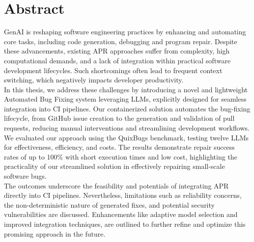 \thispagestyle{empty}%

\section*{Abstract}
\ac{GenAI} is reshaping software engineering practices by enhancing and automating core tasks, including code generation, debugging and program repair. Despite these advancements, existing \ac{APR} approaches suffer from complexity, high computational demands, and a lack of integration within practical software development lifecycles. Such shortcomings often lead to frequent context switching, which negatively impacts developer productivity.\\
In this thesis, we address these challenges by introducing a novel and lightweight Automated Bug Fixing system leveraging \acp{LLM}, explicitly designed for seamless integration into \ac{CI} pipelines. Our containerized solution automates the bug-fixing lifecycle, from GitHub issue creation to the generation and validation of pull requests, reducing manual interventions and streamlining development workflows.\\
We evaluated our approach using the QuixBugs benchmark, testing twelve LLMs for effectiveness, efficiency, and costs. The results demonstrate repair success rates of up to 100\% with short execution times and low cost, highlighting the practicality of our streamlined solution in effectively repairing small-scale software bugs. \\
The outcomes underscore the feasibility and potentials of integrating APR directly into \ac{CI} pipelines. Nevertheless, limitations such as reliability concerns, the non-deterministic nature of generated fixes, and potential security vulnerabilities are discussed. Enhancements like adaptive model selection and improved integration techniques, are outlined to further refine and optimize this promising approach in the future.
